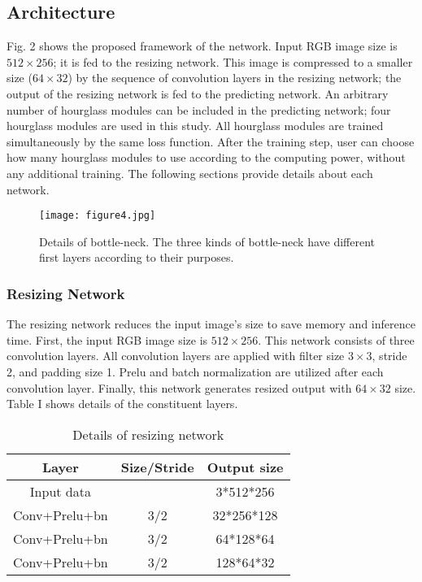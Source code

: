\documentclass[journal]{IEEEtran}
\begin{document}
\subsection{Architecture}
Fig. 2 shows the proposed framework of the network. Input RGB image size is $512 \times 256$; it is fed to the resizing network. This image is compressed to a smaller size ($64 \times 32$) by the sequence of convolution layers in the resizing network; the output of the resizing network is fed to the predicting network. An arbitrary number of hourglass modules can be included in the predicting network; four hourglass modules are used in this study. All hourglass modules are trained simultaneously by the same loss function. After the training step, user can choose how many hourglass modules to use according to the computing power, without any additional training. The following sections provide details about each network.

\begin{figure}
    \centering
    \texttt{[image: figure4.jpg]}
    \caption{Details of bottle-neck. The three kinds of bottle-neck have different first layers according to their purposes.}
\end{figure}

\subsubsection{Resizing Network}
The resizing network reduces the input image's size to save memory and inference time. First, the input RGB image size is $512 \times 256$. This network consists of three convolution layers. All convolution layers are applied with filter size $3 \times 3$, stride 2, and padding size 1. Prelu \cite{he2015delving} and batch normalization \cite{batchnorm} are utilized after each convolution layer. Finally, this network generates resized output with $64 \times 32$ size. Table I shows details of the constituent layers. 

\begin{table}[ht]
    \caption{Details of resizing network}
    \begin{center}
        \begin{tabular}{|c|c|c|}
            \hline
            \textbf{Layer} & \textbf{Size/Stride} & \textbf{Output size}\\
            \hline
            \hline
            Input data &  & 3*512*256\\
            Conv+Prelu+bn & 3/2 & 32*256*128\\
            Conv+Prelu+bn & 3/2 & 64*128*64\\
            Conv+Prelu+bn & 3/2 & 128*64*32\\
            \hline
        \end{tabular}
    \end{center}
\end{table}
\end{document}
